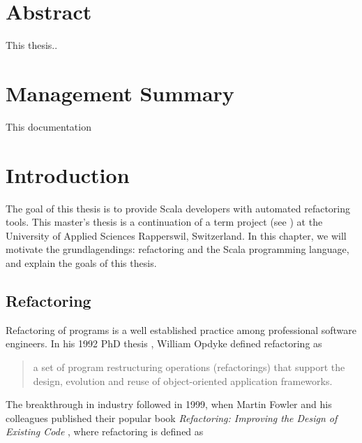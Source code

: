 \documentclass[10pt,a4paper,oneside]{scrreprt}
\begin{document}
\newcommand{\subtitlename}{Master's Thesis}
\newcommand{\titlename}{Scala Refactoring}



\emptypage

\chapter*{Abstract}


This thesis..


\chapter*{Management Summary}

This documentation 

\newpage

\setcounter{tocdepth}{2}

\tableofcontents

\newpage


\chapter{Introduction} \label{chapter:introduction}

The goal of this thesis is to provide Scala developers with automated refactoring tools. This master's thesis is a continuation of a term project (see \cite{ScalaRefactoring}) at the University of Applied Sciences Rapperswil, Switzerland. In this chapter, we will motivate the grundlagendings: refactoring and the Scala programming language, and explain the goals of this thesis.

\section{Refactoring}

Refactoring of programs is a well established practice among professional software engineers. In his 1992 PhD thesis \cite{OpdykeThesis}, William Opdyke defined refactoring as 

\begin{quotation}
a set of program restructuring operations (refactorings) that support the design, evolution and reuse of object-oriented application frameworks.
\end{quotation}

The breakthrough in industry followed in 1999, when Martin Fowler and his colleagues published their popular book \textit{Refactoring: Improving the Design of Existing Code} \cite{FowlerRefactoring}, where refactoring is defined as 
\end{document}
